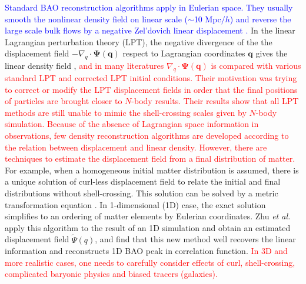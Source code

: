 \documentclass[aps,prd,twocolumn,superscriptaddress,amsfont,amssymb,amsmath,nofootinbib,showpacs,balancelastpage]{revtex4-1}
\newcommand{\bs}{\boldsymbol}
\newcommand{\tcb}{\textcolor{blue}}
\newcommand{\tcr}{\textcolor{red}}
\begin{document}
\tcb{Standard BAO reconstruction algorithms apply in Eulerian space.
They usually smooth the nonlinear density field on
linear scale ($\sim$10 Mpc$/h$) and reverse the large 
scale bulk flows by a negative Zel'dovich linear displacement
\citep{2007ApJ...664..675E,2009PhRvD..80l3501N,2009PhRvD..79f3523P}.}
In the linear Lagrangian perturbation theory (LPT), the 
negative divergence of the the displacement field
$-\nabla_q\cdot\bs\Psi(\bs q)$ respect to Lagrangian coordinates $\bs q$
gives the linear density field \citep{2010PhDT.........4J},
\tcr{and in many literatures
\cite{2013MNRAS.428..141N,2014PhRvD..89h3515C,2016JCAP...03..017B}
$\nabla_q\cdot\bs\Psi(\bs q)$ is compared with various standard LPT
and corrected LPT initial conditions. Their motivation was
trying to correct or modify the LPT displacement fields
in order that the final positions of particles are brought
closer to $N$-body results. Their results show that 
all LPT methods are still unable to mimic the shell-crossing
scales given by $N$-body simulation. Because of the absence
of Lagrangian space information in observations, few density
reconstruction algorithms are developed according to the relation
between displacement and linear density. However,
there are techniques to estimate the displacement field from a final 
distribution of matter.}
For example, when a homogeneous initial matter distribution 
is assumed, there is a unique solution of curl-less displacement field to relate 
the initial and final distributions without shell-crossing. This solution can be 
solved by a metric transformation equation
\citep{1995ApJS..100..269P,1998ApJS..115...19P}.
In 1-dimensional (1D) case, the exact solution 
simplifies to an ordering of matter elements by Eulerian coordinates.
Zhu {\it et al.} \cite{2016arXiv160907041Z} apply this algorithm to the result
of an 1D simulation \citep{2016JCAP...01..043M} and obtain an estimated
displacement field $\tilde\Psi(q)$, and find
that this new method well recovers the linear
information and reconstructs 1D BAO peak in correlation function.
\tcr{In 3D and more realistic cases, one needs to
carefully consider effects of curl, shell-crossing, 
complicated baryonic physics and biased tracers (galaxies).}
\end{document}
